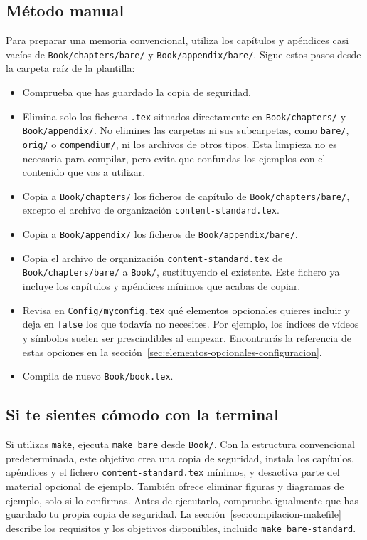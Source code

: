 \subsection{Método manual}
\label{sec:estructura-minima-manual}

Para preparar una memoria convencional, utiliza los capítulos y apéndices casi vacíos de \texttt{Book/chapters/bare/} y \texttt{Book/appendix/bare/}. Sigue estos pasos desde la carpeta raíz de la plantilla:

\begin{itemize}
  \item Comprueba que has guardado la copia de seguridad.
  \item Elimina solo los ficheros \texttt{.tex} situados directamente en \texttt{Book/chapters/} y \texttt{Book/appendix/}. No elimines las carpetas ni sus subcarpetas, como \texttt{bare/}, \texttt{orig/} o \texttt{compendium/}, ni los archivos de otros tipos. Esta limpieza no es necesaria para compilar, pero evita que confundas los ejemplos con el contenido que vas a utilizar.
  \item Copia a \texttt{Book/chapters/} los ficheros de capítulo de \texttt{Book/chapters/bare/}, excepto el archivo de organización \texttt{content-standard.tex}.
  \item Copia a \texttt{Book/appendix/} los ficheros de \texttt{Book/appendix/bare/}.
  \item Copia el archivo de organización \texttt{content-standard.tex} de \texttt{Book/chapters/bare/} a \texttt{Book/}, sustituyendo el existente. Este fichero ya incluye los capítulos y apéndices mínimos que acabas de copiar.
  \item Revisa en \texttt{Config/myconfig.tex} qué elementos opcionales quieres incluir y deja en \texttt{false} los que todavía no necesites. Por ejemplo, los índices de vídeos y símbolos suelen ser prescindibles al empezar. Encontrarás la referencia de estas opciones en la sección~\ref{sec:elementos-opcionales-configuracion}.
  \item Compila de nuevo \texttt{Book/book.tex}.
\end{itemize}

\subsection{Si te sientes cómodo con la terminal}
\label{sec:estructura-minima-make}

Si utilizas \texttt{make}, ejecuta \texttt{make bare} desde \texttt{Book/}. Con la estructura convencional predeterminada, este objetivo crea una copia de seguridad, instala los capítulos, apéndices y el fichero \texttt{content-standard.tex} mínimos, y desactiva parte del material opcional de ejemplo. También ofrece eliminar figuras y diagramas de ejemplo, solo si lo confirmas. Antes de ejecutarlo, comprueba igualmente que has guardado tu propia copia de seguridad. La sección~\ref{sec:compilacion-makefile} describe los requisitos y los objetivos disponibles, incluido \texttt{make bare-standard}.

